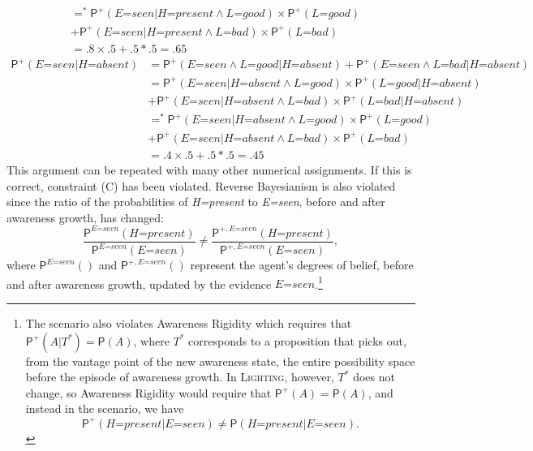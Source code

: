 \documentclass[
  11pt,
  dvipsnames,enabledeprecatedfontcommands]{scrartcl}
\newcommand{\pr}[1]{\ensuremath{\mathsf{P}(#1)}}
\newcommand{\ppr}[2]{\ensuremath{\mathsf{P}^{#1}(#2)}}
\begin{document}
{\begin{align*}
  &=^* \ppr{+}{\textit{E=seen} \vert \textit{H=present} \wedge \textit{L=good}}  \times \ppr{+}{\textit{L=good}}\\ & +\ppr{+}{\textit{E=seen}  \vert \textit{H=present} \wedge \textit{L=bad}} \times \ppr{+}{\textit{L=bad}}\\
  &= .8 \times .5 +.5 *.5 = .65 
  \end{align*} \begin{align*}
  \ppr{+}{\textit{E=seen} \vert \textit{H=absent}} &= \ppr{+}{\textit{E=seen} \wedge \textit{L=good} \vert \textit{H=absent}}+\ppr{+}{\textit{E=seen} \wedge \textit{L=bad} \vert \textit{H=absent}}\\
  &= \ppr{+}{\textit{E=seen} \vert \textit{H=absent} \wedge \textit{L=good}}  \times \ppr{+}{\textit{L=good} \vert  \textit{H=absent} }\\ & +\ppr{+}{\textit{E=seen}  \vert \textit{H=absent} \wedge \textit{L=bad}} \times \ppr{+}{\textit{L=bad} \vert  \textit{H=absent}}\\
  &=^* \ppr{+}{\textit{E=seen} \vert \textit{H=absent} \wedge \textit{L=good}}  \times \ppr{+}{\textit{L=good}}\\ & +\ppr{+}{\textit{E=seen}  \vert \textit{H=absent} \wedge \textit{L=bad}} \times \ppr{+}{\textit{L=bad}}\\
  &= .4 \times .5 +.5 *.5 = .45 
  \end{align*} This argument can be repeated with many other numerical
  assignments.} If this is correct, constraint (C) has been violated.
Reverse Bayesianism is also violated since the ratio of the
probabilities of \textit{H=present} to \textit{E=seen}, before and after
awareness growth, has changed:
\[\frac{\ppr{\textit{E=seen}}{\textit{H=present}}}{\ppr{ \textit{E=seen}}{\textit{E=seen}}} \neq \frac{\ppr{+, \textit{E=seen}}{\textit{H=present}}}{\ppr{+, \textit{E=seen}}{\textit{E=seen}}},\]
where \(\ppr{\textit{E=seen}}{}\) and \(\ppr{+, \textit{E=seen}}{}\)
represent the agent's degrees of belief, before and after awareness
growth, updated by the evidence \(\textit{E=seen}\).\footnote{The
  scenario also violates Awareness Rigidity which requires that
  \(\ppr{+}{A \vert T^*}=\pr{A}\), where \(T^*\) corresponds to a
  proposition that picks out, from the vantage point of the new
  awareness state, the entire possibility space before the episode of
  awareness growth. In \textsc{Lighting}, however, \(T^*\) does not
  change, so Awareness Rigidity would require that
  \(\ppr{+}{A}=\pr{A}\), and instead in the scenario, we have
  \[\ppr{+}{\textit{H=present} \vert \textit{E=seen}} \neq \pr{\textit{H=present} \vert \textit{E=seen}}.\]}
\end{document}
